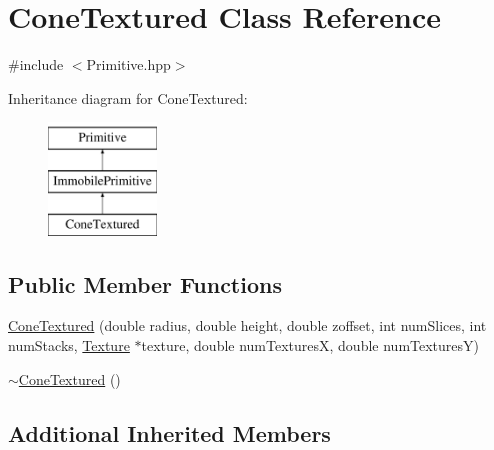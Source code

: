 \hypertarget{class_cone_textured}{\section{Cone\-Textured Class Reference}
\label{class_cone_textured}
}


{\ttfamily \#include $<$Primitive.\-hpp$>$}

Inheritance diagram for Cone\-Textured\-:\begin{figure}[H]
\begin{center}
\leavevmode
\includegraphics[height=3.000000cm]{class_cone_textured}
\end{center}
\end{figure}
\subsection*{Public Member Functions}
\begin{DoxyCompactItemize}
\item 
\hyperlink{class_cone_textured_a4c8c4a32295527f54c8af0a64c552b56}{Cone\-Textured} (double radius, double height, double zoffset, int num\-Slices, int num\-Stacks, \hyperlink{class_texture}{Texture} $\ast$texture, double num\-Textures\-X, double num\-Textures\-Y)
\item 
\hyperlink{class_cone_textured_a1a98d084be791913ce93b02559aa85f8}{$\sim$\-Cone\-Textured} ()
\end{DoxyCompactItemize}
\subsection*{Additional Inherited Members}


